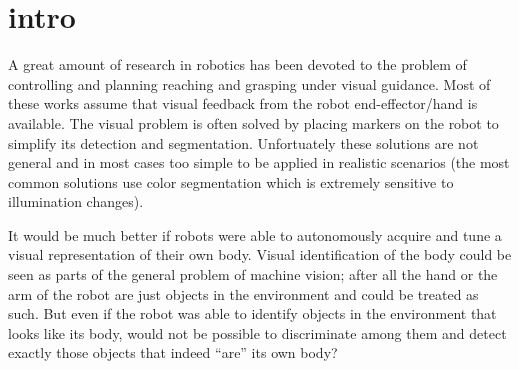 \documentclass[conference]{IEEEtran}
\begin{document}
%

%
%
\section{intro}\label{intro}
A great amount of research in robotics has been devoted to the problem of 
controlling and planning reaching and grasping under visual guidance. Most 
of these works assume that visual feedback from the robot 
end-effector/hand is available. The visual problem is often solved by 
placing markers on the robot to simplify its detection and 
segmentation. Unfortuately these solutions are not general and in most cases 
too simple to be applied in realistic 
scenarios (the most common solutions use 
color segmentation which is extremely sensitive to illumination changes).

It would be much better if robots were able to autonomously acquire and tune 
a visual representation of their own body. Visual identification of the body 
could be seen as parts of the general problem of machine vision; after all the 
hand or the arm of the robot are just objects in the environment and could be 
treated as such. But even if the robot was able to identify objects in the 
environment that looks like its body, would not be possible to discriminate 
among them and detect exactly those objects that indeed ``are'' its own body?
\end{document}
